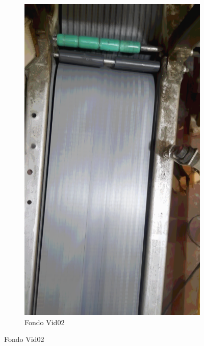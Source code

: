 \documentclass[11pt]{memoir}
\begin{document}
\begin{center}
\begin{figure}[H]
\begin{subfigure}{0.3\textwidth}
    \includegraphics[width=\textwidth]{img/F3}
    \caption{Fondo Vid02}
    \label{fig:fondo-Vid02}
\end{subfigure}
\end{figure}
\end{center}
\end{document}
